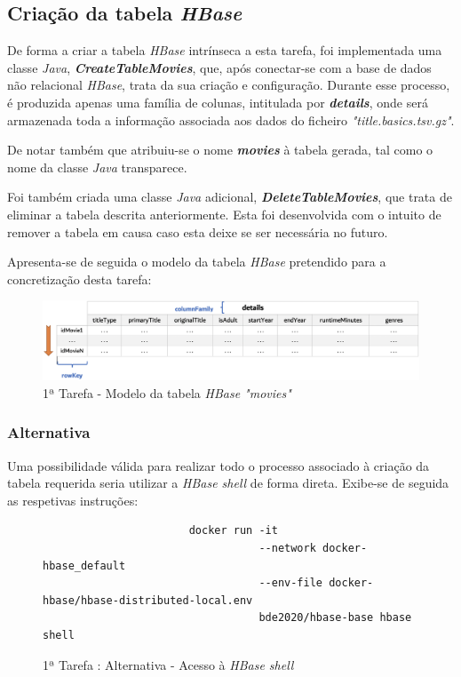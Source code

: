 \documentclass[a4paper]{report}
\begin{document}
{		\subsection{Criação da tabela \textit{HBase}} \label{subsec:Task1-1}
		De forma a criar a tabela \textit{HBase} intrínseca a esta tarefa, foi implementada uma classe \textit{Java}, \textbf{\textit{CreateTableMovies}}, que, após conectar-se com a base de dados não relacional \textit{HBase}, trata da sua criação e configuração.
		Durante esse processo, é produzida apenas uma família de colunas, intitulada por \textbf{\textit{details}}, onde será armazenada toda a informação associada aos dados do ficheiro \textit{"title.basics.tsv.gz"}.

		De notar também que atribuiu-se o nome \textbf{\textit{movies}} à tabela gerada, tal como o nome da classe \textit{Java} transparece.

		Foi também criada uma classe \textit{Java} adicional, \textbf{\textit{DeleteTableMovies}}, que trata de eliminar a tabela descrita anteriormente.
		Esta foi desenvolvida com o intuito de remover a tabela em causa caso esta deixe se ser necessária no futuro.
        
        Apresenta-se de seguida o modelo da tabela \textit{HBase} pretendido para a concretização desta tarefa:
        \begin{figure}[H]
            \centering
            \includegraphics[width=1.0\textwidth]{Imagens/1ª Tarefa - Tabela Hbase.png}
            \caption{1ª Tarefa - Modelo da tabela \textit{HBase "movies"}}
            \label{fig:5}
        \end{figure}

			\subsubsection{Alternativa}
			Uma possibilidade válida para realizar todo o processo associado à criação da tabela requerida seria utilizar a \textit{HBase shell} de forma direta.
			Exibe-se de seguida as respetivas instruções:
			\begin{figure}[H]
				{
					\color{teal}
					\begin{verbatim}
					   docker run -it
					              --network docker-hbase_default
					              --env-file docker-hbase/hbase-distributed-local.env
					              bde2020/hbase-base hbase shell
					\end{verbatim}
				}
				\caption{1ª Tarefa : Alternativa - Acesso à \textit{HBase shell}}
				\label{fig:6}
			\end{figure}

}
\end{document}
